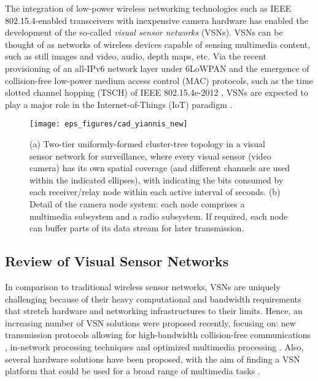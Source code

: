 \documentclass[twocolumn,english]{IEEEtran}
\theoremstyle{plain}
\theoremstyle{definition}
\begin{document}
The integration of low-power wireless networking technologies such
as IEEE 802.15.4-enabled transceivers with inexpensive camera hardware
has enabled the development of the so-called \emph{visual sensor networks}
(VSNs)\cite{charfi2009VSN}. VSNs can be thought of as networks of
wireless devices capable of sensing multimedia content, such as still
images and video, audio, depth maps, etc. Via the recent provisioning
of an all-IPv6 network layer under 6LoWPAN \cite{wang2012IPV6} and
the emergence of collision-free low-power medium access control (MAC)
protocols, such as the time slotted channel hopping (TSCH) of IEEE
802.15.4e-2012 \cite{tinka2010TSCH}, VSNs are expected to play a
major role in the Internet-of-Things (IoT) paradigm \cite{zorzi2010IoT,gubbi2013IoT}.







\begin{figure*}[t]
\centering{}

\texttt{[image: eps\_figures/cad\_yiannis\_new]}
\caption{(a) Two-tier uniformly-formed cluster-tree topology in a visual sensor
network for surveillance, where every visual sensor (video camera)
has its own spatial coverage (and different channels are used within
the indicated ellipses), with  indicating the bits consumed by
each receiver/relay node within each active interval of  seconds.
(b) Detail of the camera node system: each node comprises a multimedia
subsystem and a radio subsystem. If required, each node can buffer
parts of its data stream for later transmission. }


\label{fig:System_model} 
\end{figure*}



\subsection{Review of Visual Sensor Networks}

In comparison to traditional wireless sensor networks, VSNs are uniquely
challenging because of their heavy computational and bandwidth requirements
that stretch hardware and networking infrastructures to their limits.
Hence, an increasing number of VSN solutions were proposed recently,
focusing on: new transmission protocols allowing for high-bandwidth
collision-free communications \cite{ehsan2012survey}\cite{burana2012DTFDMA},
in-network processing techniques \cite{zuo2012two} and optimized
multimedia processing \cite{pudlewski2012compressed}. Also, several
hardware solutions have been proposed, with the aim of finding a VSN
platform that could be used for a broad range of multimedia tasks
\cite{mingorance2010efficient,newell2009self,CancliniSENSYS2013}.
\end{document}
